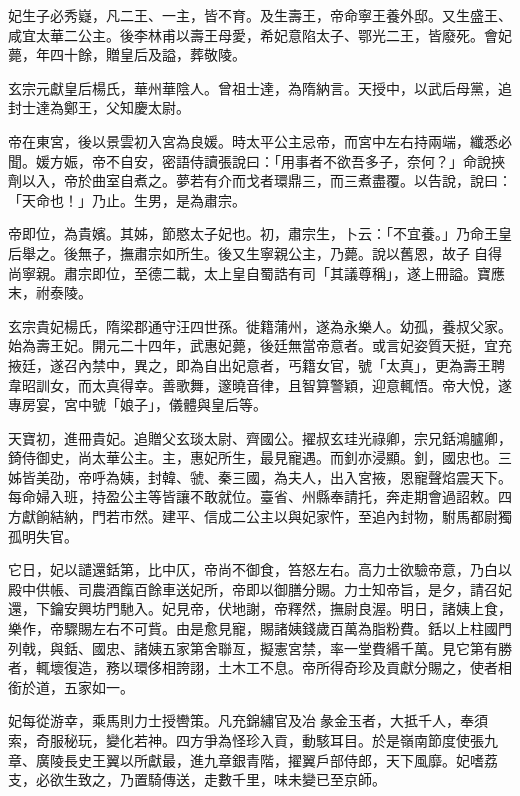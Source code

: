 \begin{pinyinscope}
 妃生子必秀嶷，凡二王、一主，皆不育。及生壽王，帝命寧王養外邸。又生盛王、咸宜太華二公主。後李林甫以壽王母愛，希妃意陷太子、鄂光二王，皆廢死。會妃薨，年四十餘，贈皇后及謚，葬敬陵。



 玄宗元獻皇后楊氏，華州華陰人。曾祖士達，為隋納言。天授中，以武后母黨，追封士達為鄭王，父知慶太尉。



 帝在東宮，後以景雲初入宮為良媛。時太平公主忌帝，而宮中左右持兩端，纖悉必聞。媛方娠，帝不自安，密語侍讀張說曰：「用事者不欲吾多子，奈何？」命說挾劑以入，帝於曲室自煮之。夢若有介而戈者環鼎三，而三煮盡覆。以告說，說曰：「天命也！」乃止。生男，是為肅宗。



 帝即位，為貴嬪。其姊，節愍太子妃也。初，肅宗生，卜云：「不宜養。」乃命王皇后舉之。後無子，撫肅宗如所生。後又生寧親公主，乃薨。說以舊恩，故子自得尚寧親。肅宗即位，至德二載，太上皇自蜀誥有司「其議尊稱」，遂上冊謚。寶應末，祔泰陵。



 玄宗貴妃楊氏，隋梁郡通守汪四世孫。徙籍蒲州，遂為永樂人。幼孤，養叔父家。始為壽王妃。開元二十四年，武惠妃薨，後廷無當帝意者。或言妃姿質天挺，宜充掖廷，遂召內禁中，異之，即為自出妃意者，丐籍女官，號「太真」，更為壽王聘韋昭訓女，而太真得幸。善歌舞，邃曉音律，且智算警穎，迎意輒悟。帝大悅，遂專房宴，宮中號「娘子」，儀體與皇后等。



 天寶初，進冊貴妃。追贈父玄琰太尉、齊國公。擢叔玄珪光祿卿，宗兄銛鴻臚卿，錡侍御史，尚太華公主。主，惠妃所生，最見寵遇。而釗亦浸顯。釗，國忠也。三姊皆美劭，帝呼為姨，封韓、虢、秦三國，為夫人，出入宮掖，恩寵聲焰震天下。每命婦入班，持盈公主等皆讓不敢就位。臺省、州縣奉請托，奔走期會過詔敕。四方獻餉結納，門若市然。建平、信成二公主以與妃家忤，至追內封物，駙馬都尉獨孤明失官。



 它日，妃以譴還銛第，比中仄，帝尚不御食，笞怒左右。高力士欲驗帝意，乃白以殿中供帳、司農酒餼百餘車送妃所，帝即以御膳分賜。力士知帝旨，是夕，請召妃還，下鑰安興坊門馳入。妃見帝，伏地謝，帝釋然，撫尉良渥。明日，諸姨上食，樂作，帝驟賜左右不可貲。由是愈見寵，賜諸姨錢歲百萬為脂粉費。銛以上柱國門列戟，與銛、國忠、諸姨五家第舍聯亙，擬憲宮禁，率一堂費緡千萬。見它第有勝者，輒壞復造，務以環侈相誇詡，土木工不息。帝所得奇珍及貢獻分賜之，使者相銜於道，五家如一。



 妃每從游幸，乘馬則力士授轡策。凡充錦繡官及冶彖金玉者，大抵千人，奉須索，奇服秘玩，變化若神。四方爭為怪珍入貢，動駭耳目。於是嶺南節度使張九章、廣陵長史王翼以所獻最，進九章銀青階，擢翼戶部侍郎，天下風靡。妃嗜荔支，必欲生致之，乃置騎傳送，走數千里，味未變已至京師。




\end{pinyinscope}
